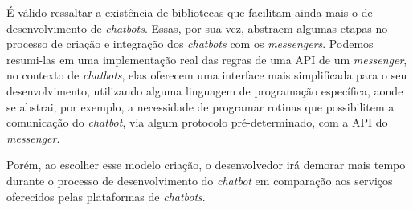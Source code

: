 É válido ressaltar a existência de bibliotecas que facilitam ainda mais o de desenvolvimento de \textit{chatbots}. Essas, por sua vez, abstraem algumas etapas no processo de criação e integração dos \textit{chatbots} com os \textit{messengers}. Podemos resumi-las em uma implementação real das regras de uma API de um \textit{messenger}, no contexto de \textit{chatbots}, elas oferecem uma interface mais simplificada para o seu desenvolvimento, utilizando alguma linguagem de programação específica, aonde se abstrai, por exemplo, a necessidade de programar rotinas que possibilitem a comunicação do \textit{chatbot}, via algum protocolo pré-determinado, com a API do \textit{messenger}.

Porém, ao escolher esse modelo criação, o desenvolvedor irá demorar mais tempo durante o processo de desenvolvimento do \textit{chatbot} em comparação aos serviços oferecidos pelas plataformas de \textit{chatbots}. 


